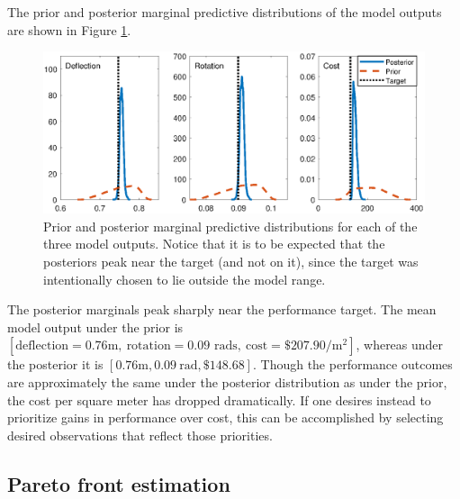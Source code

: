 \documentclass{article}
\begin{document}
%
The prior and posterior marginal predictive distributions of the model outputs are shown in Figure \ref{fig:prior_post_pred_comp}.
%
\begin{figure}
\centering
\includegraphics[scale=0.8]{FIG_prior_vs_posterior_dist}
\captionsetup{width=.85\linewidth}
\caption{Prior and posterior marginal predictive distributions for each of the three model outputs. Notice that it is to be expected that the posteriors peak near the target (and not on it), since the target was intentionally chosen to lie outside the model range.}
\label{fig:prior_post_pred_comp}
\end{figure}
%
The posterior marginals peak sharply near the performance target.
%
The mean model output under the prior is $[\text{deflection}=0.76\mathrm m,\ \text{rotation}=0.09\text{ rads},\ \text{cost}=\$207.90/\mathrm m^2]$, whereas under the posterior it is $[0.76\mathrm m,0.09\ \mathrm{rad},\$148.68]$.
%
Though the performance outcomes are approximately the same under the posterior distribution as under the prior, the cost per square meter has dropped dramatically.
%
If one desires instead to prioritize gains in performance over cost, this can be accomplished by selecting desired observations that reflect those priorities. 

\subsection{Pareto front estimation}\label{removing_cal_pars}

\end{document}
